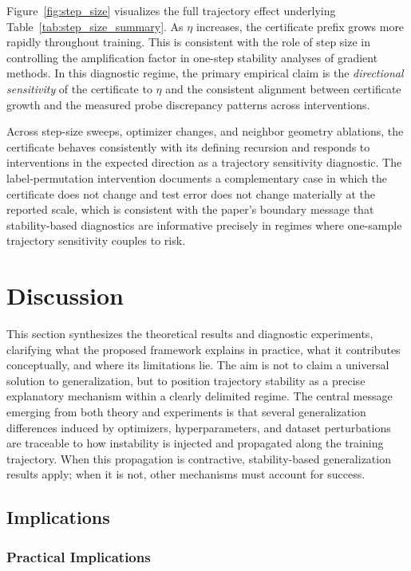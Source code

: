 \documentclass{article}
\numberwithin{equation}{section}
\begin{document}
Figure~\ref{fig:step_size} visualizes the full trajectory effect underlying Table~\ref{tab:step_size_summary}. As $\eta$ increases, the certificate prefix grows more rapidly throughout training. This is consistent with the role of step size in controlling the amplification factor in one-step stability analyses of gradient methods. In this diagnostic regime, the primary empirical claim is the \emph{directional sensitivity} of the certificate to $\eta$ and the consistent alignment between certificate growth and the measured probe discrepancy patterns across interventions.

Across step-size sweeps, optimizer changes, and neighbor geometry ablations, the certificate behaves consistently with its defining recursion and responds to interventions in the expected direction as a trajectory sensitivity diagnostic. The label-permutation intervention documents a complementary case in which the certificate does not change and test error does not change materially at the reported scale, which is consistent with the paper's boundary message that stability-based diagnostics are informative precisely in regimes where one-sample trajectory sensitivity couples to risk.

\section{Discussion}
\label{sec:discussion}

This section synthesizes the theoretical results and diagnostic experiments, clarifying what the proposed framework explains in practice, what it contributes conceptually, and where its limitations lie. The aim is not to claim a universal solution to generalization, but to position trajectory stability as a precise explanatory mechanism within a clearly delimited regime. The central message emerging from both theory and experiments is that several generalization differences induced by optimizers, hyperparameters, and dataset perturbations are traceable to how instability is injected and propagated along the training trajectory. When this propagation is contractive, stability-based generalization results apply; when it is not, other mechanisms must account for success.

\subsection{Implications}
\label{subsec:discussion_implications}

\subsubsection{Practical Implications}
\label{subsubsec:discussion_practical}
\end{document}
